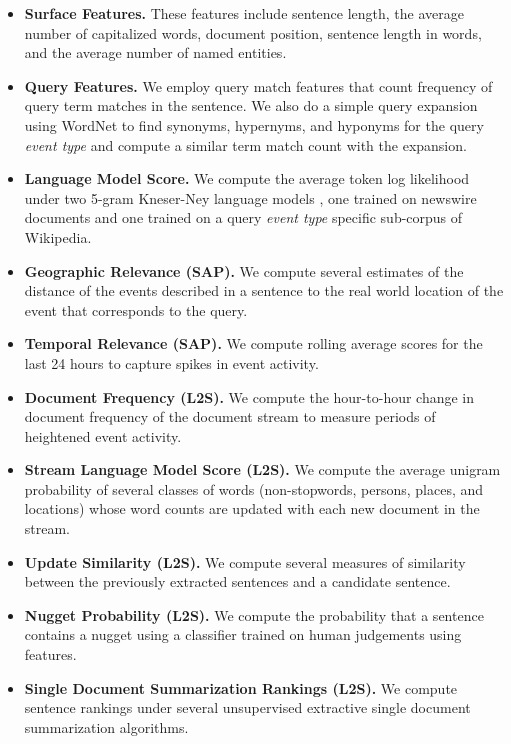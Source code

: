 \begin{itemize}
    \item \textbf{Surface Features.} These features 
include sentence length, the average number of capitalized words,
document position, sentence length in words, and the average number of 
named entities.
    \item \textbf{Query Features.} We employ query match features that count frequency of query term matches
in the sentence. We also do a simple query expansion using WordNet 
\citep{miller1995wordnet}
to find  synonyms, hypernyms, and hyponyms for the query \textit{event type}
and compute
a similar term match count with the expansion.
    \item \textbf{Language Model Score.} We compute the 
        average token log likelihood under two 5-gram Kneser-Ney language 
        models \citep{kneser1995improved}, one trained on newswire documents 
        and one trained on a query 
        \textit{event type} specific sub-corpus of Wikipedia.
    \item \textbf{Geographic Relevance (SAP).} We compute several estimates of the
        distance of the events described in a sentence to the 
        real world location of the event that corresponds to the query.
    \item \textbf{Temporal Relevance (SAP).} We compute rolling average \tfidf{} 
        scores for the last 24 hours to capture spikes in event activity.
    \item \textbf{Document Frequency (L2S).} We compute the hour-to-hour
        change in document
        frequency of the document stream to measure periods of heightened
        event activity. 
    \item \textbf{Stream Language Model Score (L2S).} We compute the average 
        unigram probability of several classes of words (non-stopwords, 
        persons,
        places, and locations) whose word counts are updated with each new 
        document in the stream.
    \item \textbf{Update Similarity (L2S).} We compute several measures of similarity
        between the previously extracted sentences and a candidate sentence.
    \item \textbf{Nugget Probability (L2S).} We compute the probability that a
        sentence contains a nugget using a classifier trained on human 
        judgements using \ngram{} features.
    \item \textbf{Single Document Summarization Rankings (L2S).} We compute sentence
        rankings under several unsupervised extractive single document 
        summarization algorithms.
\end{itemize}


